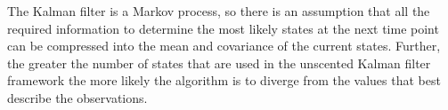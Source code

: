 The Kalman filter is a Markov process, so there is an assumption that all the required information to determine the most likely states at the next time point can be compressed into the mean and covariance of the current states. Further, the greater the number of states that are used in the unscented Kalman filter framework the more likely the algorithm is to diverge from the values that best describe the observations. 